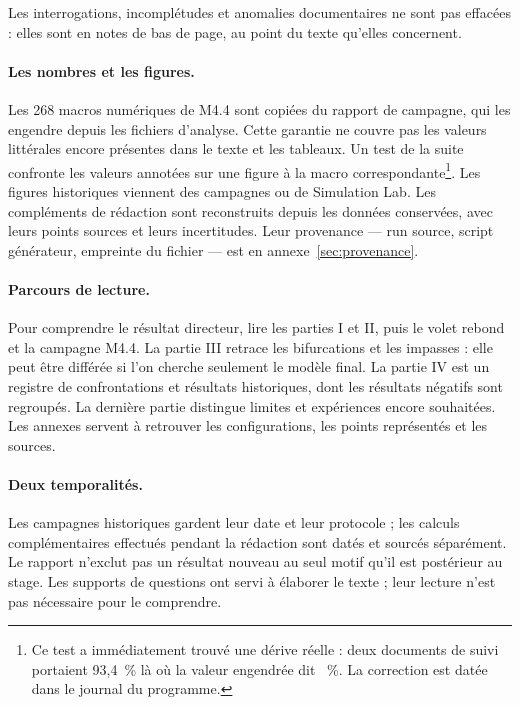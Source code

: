 \documentclass[11pt,a4paper]{article}
\begin{document}
Les interrogations, incomplétudes et anomalies documentaires ne sont pas
effacées : elles sont en notes de bas de page, au point du texte qu'elles
concernent.

\paragraph{Les nombres et les figures.} Les 268 macros numériques de M4.4
sont copiées du rapport de campagne, qui les engendre depuis les
fichiers d'analyse. Cette garantie ne couvre pas les valeurs littérales
encore présentes dans le texte et les tableaux. Un test de la suite confronte les valeurs annotées sur
une figure à la macro correspondante\footnote{Ce test a immédiatement trouvé
une dérive réelle : deux documents de suivi portaient 93,4~\% là où la valeur
engendrée dit \PartAnnuleeKzero~\%. La correction est datée dans le journal du
programme.}. Les figures historiques viennent des campagnes ou de Simulation
Lab. Les compléments de rédaction sont reconstruits depuis les données
conservées, avec leurs points sources et leurs incertitudes. Leur provenance --- run source, script générateur, empreinte du
fichier --- est en annexe~\ref{sec:provenance}.

\paragraph{Parcours de lecture.}
Pour comprendre le résultat directeur, lire les parties I et II, puis le volet
rebond et la campagne M4.4. La partie III retrace les bifurcations et les
impasses : elle peut être différée si l'on cherche seulement le modèle final.
La partie IV est un registre de confrontations et résultats historiques,
dont les résultats négatifs sont regroupés. La dernière partie distingue
limites et expériences encore souhaitées. Les annexes servent à retrouver
les configurations, les points représentés et les sources.

\paragraph{Deux temporalités.}
Les campagnes historiques gardent leur date et leur protocole ; les calculs
complémentaires effectués pendant la rédaction sont datés et sourcés
séparément. Le rapport n'exclut pas un résultat nouveau au seul motif qu'il est
postérieur au stage. Les supports de questions ont servi à élaborer le texte ;
leur lecture n'est pas nécessaire pour le comprendre.
\end{document}
